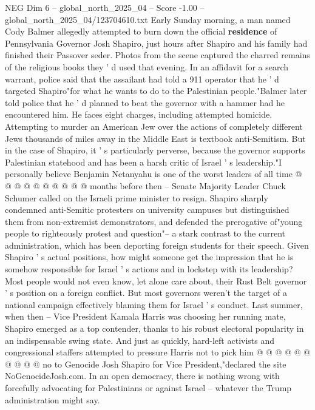 \begin{textsample}{NEG Dim 6 – global\_north\_2025\_04 – Score -1.00 – global\_north\_2025\_04/123704610.txt}  \label{ex:f6_neg_264}
Early Sunday morning, a man named Cody Balmer allegedly attempted to burn down the official \textbf{residence} of Pennsylvania Governor Josh Shapiro, just hours after Shapiro and his family had finished their Passover seder.
Photos from the scene captured the charred remains of the religious books they ' d used that evening.
In an affidavit for a search warrant, police said that the assailant had told a 911 operator that he ' d targeted Shapiro"for what he wants to do to the Palestinian people."Balmer later told police that he ' d planned to beat the governor with a hammer had he encountered him.
He faces eight charges, including attempted homicide.
Attempting to murder an American Jew over the actions of completely different Jews thousands of miles away in the Middle East is textbook anti-Semitism.
But in the case of Shapiro, it ' s particularly perverse, because the governor supports Palestinian statehood and has been a harsh critic of Israel ' s leadership."I personally believe Benjamin Netanyahu is one of the worst leaders of all time @ @ @ @ @ @ @ @ @ @ months before then -- Senate Majority Leader Chuck Schumer called on the Israeli prime minister to resign.
Shapiro sharply condemned anti-Semitic protesters on university campuses but distinguished them from non-extremist demonstrators, and defended the prerogative of"young people to righteously protest and question"-- a stark contrast to the current administration, which has been deporting foreign students for their speech.
Given Shapiro ' s actual positions, how might someone get the impression that he is somehow responsible for Israel ' s actions and in lockstep with its leadership?
Most people would not even know, let alone care about, their Rust Belt governor ' s position on a foreign conflict.
But most governors weren't the target of a national campaign effectively blaming them for Israel ' s conduct.
Last summer, when then -- Vice President Kamala Harris was choosing her running mate, Shapiro emerged as a top contender, thanks to his robust electoral popularity in an indispensable swing state.
And just as quickly, hard-left activists and congressional staffers attempted to pressure Harris not to pick him @ @ @ @ @ @ @ @ @ @ no to Genocide Josh Shapiro for Vice President,"declared the site NoGenocideJosh.com.
In an open democracy, there is nothing wrong with forcefully advocating for Palestinians or against Israel -- whatever the Trump administration might say.

\end{textsample}
